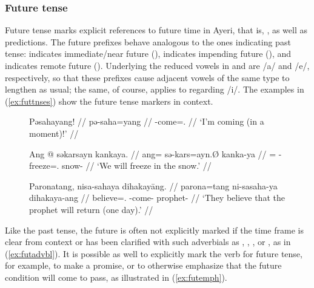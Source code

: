 
\subsubsection{Future tense}
\label{subsubsec:future}

Future tense marks explicit references to future time in Ayeri, that is,
, as well
as predictions. The future prefixes behave analogous to the ones indicating
past tense:  indicates immediate/near future (\NFut{}),
 indicates impending future (\Fut{}), and 
indicates remote future (\RFut{}). Underlying the reduced vowels in
 and  are /a/ and /e/, respectively, so that these
prefixes cause adjacent vowels of the same type to lengthen as
usual; the same, of course, applies to 
regarding /i/. The examples in (\ref{ex:futtnses}) show the future tense
markers in context.

\begin{figure}
\pex\label{ex:futtnses}
\a\label{ex:nfut}\begingl
	\gla Pəsahayang! //
	\glb pə-saha=yang //
	\glc \NFut{}-come=\Fsg{}.\Aarg{} //
	\glft `I'm coming (in a moment)!' //
\endgl

\a\label{ex:fut}\begingl
	\gla Ang @ səkarsayn kankaya. //
	\glb ang= sə-kars=ayn.Ø kanka-ya //
	\glc \AgtT{}= \Fut{}-freeze=\Fsg{}.\Top{} snow-\Loc{} //
	\glft `We will freeze in the snow.' //
\endgl

\a\label{ex:rfut}\begingl
	\gla Paronatang, nisa-sahaya dihakayāng. //
	\glb parona=tang ni-sa\til{}saha-ya dihakaya-ang //
	\glc believe=\TplM{}.\Aarg{} \RFut{}-\Iter{}\til{}come-\TsgM{} 
		prophet-\Aarg{} //
	\glft `They believe that the prophet will return (one day).' //
\endgl
\xe
\end{figure}

Like the past tense, the future is often not explicitly marked if the time 
frame is clear from context or has been clarified with such adverbials as 
, , , or , as in (\ref{ex:futadvbl}). It is possible as well to
explicitly mark the verb for future tense, for example, to make a promise, or
to otherwise emphasize that the future condition will come to pass, as
illustrated in (\ref{ex:futemph}).

